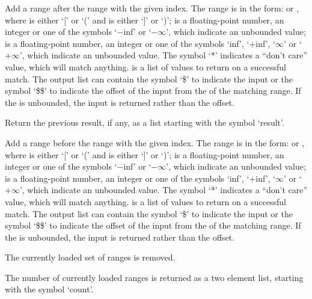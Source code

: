   Add a range after the range with the given index.
  The range is in the form:  or , where
   is either `[' or `(' and  is either `]' or `)';
   is a floating-point number, an integer or one of the symbols `$-$inf' or
  `$-\infty$', which indicate an unbounded value;
   is a floating-point number, an integer or one of the symbols
  `inf', `$+$inf', `$\infty$' or `$+\infty$', which indicate an unbounded value.
  The symbol `*' indicates a ``don't care'' value, which will match anything.
   is a list of values to return on a successful match.
  The output list can contain the symbol `\$' to indicate the input or the symbol `\$\$' to
  indicate the offset of the input from the  of the matching range.
  If the  is unbounded, the input is returned rather than the offset.

  Return the previous result, if any, as a list starting with the symbol `result'.

  Add a range before the range with the given index.
  The range is in the form:  or , where
   is either `[' or `(' and  is either `]' or `)';
   is a floating-point number, an integer or one of the symbols `$-$inf' or
  `$-\infty$', which indicate an unbounded value;
   is a floating-point number, an integer or one of the symbols
  `inf', `$+$inf', `$\infty$' or `$+\infty$', which indicate an unbounded value.
  The symbol `*' indicates a ``don't care'' value, which will match anything.
   is a list of values to return on a successful match.
  The output list can contain the symbol `\$' to indicate the input or the symbol `\$\$' to
  indicate the offset of the input from the  of the matching range.
  If the  is unbounded, the input is returned rather than the offset.

  The currently loaded set of ranges is removed.
  
  The number of currently loaded ranges is returned as a two element list, starting with the symbol
  `count'.
  
